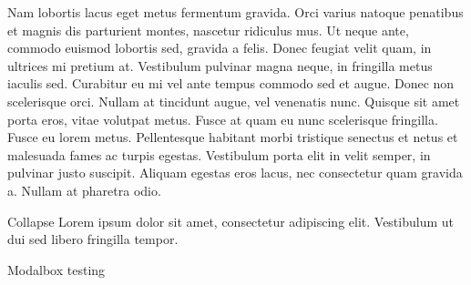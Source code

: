 \documentclass{article}
\begin{document}
Nam lobortis lacus eget metus fermentum gravida. Orci varius natoque penatibus et magnis dis parturient montes, nascetur ridiculus mus. Ut neque ante, commodo euismod lobortis sed, gravida a felis. Donec feugiat velit quam, in ultrices mi pretium at. Vestibulum pulvinar magna neque, in fringilla metus iaculis sed. Curabitur eu mi vel ante tempus commodo sed et augue. Donec non scelerisque orci. Nullam at tincidunt augue, vel venenatis nunc. Quisque sit amet porta eros, vitae volutpat metus. Fusce at quam eu nunc scelerisque fringilla. Fusce eu lorem metus. Pellentesque habitant morbi tristique senectus et netus et malesuada fames ac turpis egestas. Vestibulum porta elit in velit semper, in pulvinar justo suscipit. Aliquam egestas eros lacus, nec consectetur quam gravida a. Nullam at pharetra odio. 

\begin{collapse}{Collapse}
Lorem ipsum dolor sit amet, consectetur adipiscing elit. Vestibulum ut dui sed libero fringilla tempor.  
\end{collapse}
\linebreak
\begin{modalbox}{Modalbox}
testing
\end{modalbox}
\end{document}
